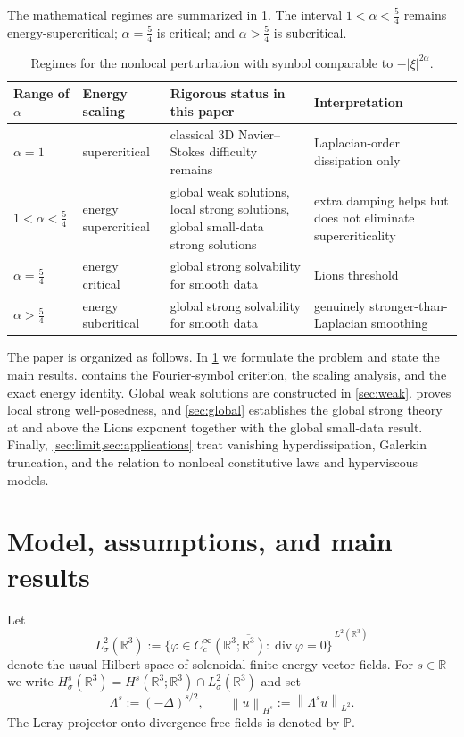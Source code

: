 \documentclass[11pt]{article}
\theoremstyle{definition}
\theoremstyle{remark}
\newcommand{\R}{\mathbb{R}}
\newcommand{\Pcal}{\mathbb{P}}
\newcommand{\norm}[1]{\left\lVert #1\right\rVert}
\newcommand{\diver}{\operatorname{div}}
\begin{document}
The mathematical regimes are summarized in \cref{tab:regimes}. The interval $1<\alpha<\frac54$ remains energy-supercritical; $\alpha=\frac54$ is critical; and $\alpha>\frac54$ is subcritical.

\begin{table}[ht]
\centering
\begin{tabular}{>{\raggedright\arraybackslash}p{2.2cm} >{\raggedright\arraybackslash}p{3.2cm} >{\raggedright\arraybackslash}p{3.8cm} >{\raggedright\arraybackslash}p{4.2cm}}
\toprule
Range of $\alpha$ & Energy scaling & Rigorous status in this paper & Interpretation \\
\midrule
$\alpha=1$ & supercritical & classical 3D Navier--Stokes difficulty remains & Laplacian-order dissipation only \\
$1<\alpha<\frac54$ & energy supercritical & global weak solutions, local strong solutions, global small-data strong solutions & extra damping helps but does not eliminate supercriticality \\
$\alpha=\frac54$ & energy critical & global strong solvability for smooth data & Lions threshold \\
$\alpha>\frac54$ & energy subcritical & global strong solvability for smooth data & genuinely stronger-than-Laplacian smoothing \\
\bottomrule
\end{tabular}
\caption{Regimes for the nonlocal perturbation with symbol comparable to $-|\xi|^{2\alpha}$.}
\label{tab:regimes}
\end{table}

The paper is organized as follows. In \cref{sec:model} we formulate the problem and state the main results.  contains the Fourier-symbol criterion, the scaling analysis, and the exact energy identity. Global weak solutions are constructed in \cref{sec:weak}.  proves local strong well-posedness, and \cref{sec:global} establishes the global strong theory at and above the Lions exponent together with the global small-data result. Finally, \cref{sec:limit,sec:applications} treat vanishing hyperdissipation, Galerkin truncation, and the relation to nonlocal constitutive laws and hyperviscous models.

\section{Model, assumptions, and main results}\label{sec:model}

Let
\[
L^2_\sigma(\R^3) := \overline{\{ \varphi\in C_c^\infty(\R^3;\R^3): \diver \varphi =0\}}^{\,L^2(\R^3)}
\]
denote the usual Hilbert space of solenoidal finite-energy vector fields. For $s\in\R$ we write $H^s_\sigma(\R^3)=H^s(\R^3;\R^3)\cap L^2_\sigma(\R^3)$ and set
\[
\Lambda^s := (-\Delta)^{s/2},
\qquad
\norm{u}_{H^s}:=\norm{\Lambda^s u}_{L^2}.
\]
The Leray projector onto divergence-free fields is denoted by $\Pcal$.
\end{document}
